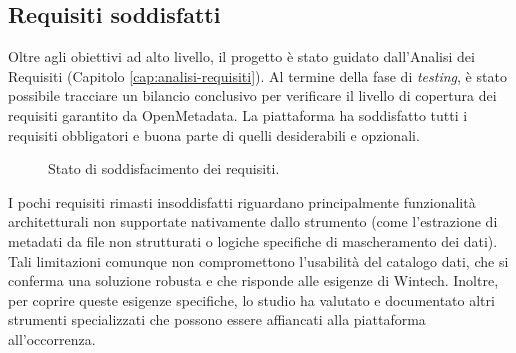 \subsection{Requisiti soddisfatti}
Oltre agli obiettivi ad alto livello, il progetto è stato guidato dall'Analisi dei Requisiti (Capitolo \ref{cap:analisi-requisiti}). 
Al termine della fase di \emph{testing}, è stato possibile tracciare un bilancio conclusivo per verificare il livello di copertura dei requisiti garantito da OpenMetadata. 
La piattaforma ha soddisfatto tutti i requisiti obbligatori e buona parte di quelli desiderabili e opzionali.

\begin{figure}[H]
\centering
{}
\caption{Stato di soddisfacimento dei requisiti.}
\label{fig:requisiti-grafico}
\end{figure}

I pochi requisiti rimasti insoddisfatti riguardano principalmente funzionalità architetturali non supportate nativamente dallo strumento 
(come l'estrazione di metadati da file non strutturati o logiche specifiche di mascheramento dei dati). 
Tali limitazioni comunque non compromettono l'usabilità del catalogo dati, che si conferma una soluzione robusta e che risponde alle esigenze di Wintech. 
Inoltre, per coprire queste esigenze specifiche, lo studio ha valutato e documentato altri strumenti specializzati che possono essere affiancati alla piattaforma all'occorrenza.


